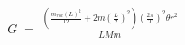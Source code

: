 \documentclass[preview]{standalone}
\begin{document}
\begin{align*}
G \;=\; \frac{(\frac{m_{rod}(L)^2}{12}+2m(\frac{L}{2})^2)(\frac{2\pi}{T})^2\theta r^2}{LMm}
\end{align*}
\end{document}
